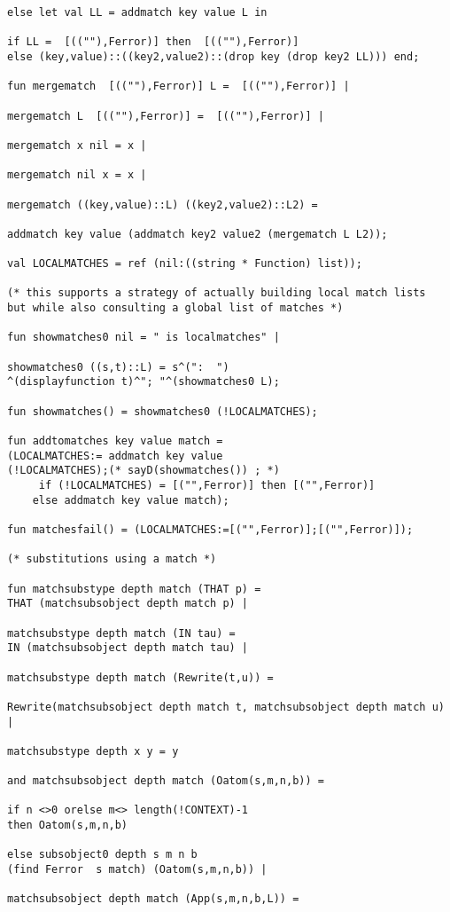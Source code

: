 \documentclass[12pt]{article}
\begin{document}
\begin{verbatim}
else let val LL = addmatch key value L in

if LL =  [((""),Ferror)] then  [((""),Ferror)]
else (key,value)::((key2,value2)::(drop key (drop key2 LL))) end;

fun mergematch  [((""),Ferror)] L =  [((""),Ferror)] |

mergematch L  [((""),Ferror)] =  [((""),Ferror)] |

mergematch x nil = x |

mergematch nil x = x |

mergematch ((key,value)::L) ((key2,value2)::L2) =

addmatch key value (addmatch key2 value2 (mergematch L L2));

val LOCALMATCHES = ref (nil:((string * Function) list));

(* this supports a strategy of actually building local match lists
but while also consulting a global list of matches *)

fun showmatches0 nil = " is localmatches" |

showmatches0 ((s,t)::L) = s^(":  ")
^(displayfunction t)^"; "^(showmatches0 L);

fun showmatches() = showmatches0 (!LOCALMATCHES);

fun addtomatches key value match = 
(LOCALMATCHES:= addmatch key value 
(!LOCALMATCHES);(* sayD(showmatches()) ; *)
     if (!LOCALMATCHES) = [("",Ferror)] then [("",Ferror)]
    else addmatch key value match);

fun matchesfail() = (LOCALMATCHES:=[("",Ferror)];[("",Ferror)]);

(* substitutions using a match *)

fun matchsubstype depth match (THAT p) = 
THAT (matchsubsobject depth match p) |

matchsubstype depth match (IN tau) = 
IN (matchsubsobject depth match tau) |

matchsubstype depth match (Rewrite(t,u)) =

Rewrite(matchsubsobject depth match t, matchsubsobject depth match u) |

matchsubstype depth x y = y

and matchsubsobject depth match (Oatom(s,m,n,b)) =

if n <>0 orelse m<> length(!CONTEXT)-1 
then Oatom(s,m,n,b)

else subsobject0 depth s m n b 
(find Ferror  s match) (Oatom(s,m,n,b)) |

matchsubsobject depth match (App(s,m,n,b,L)) =


\end{verbatim}
\end{document}
